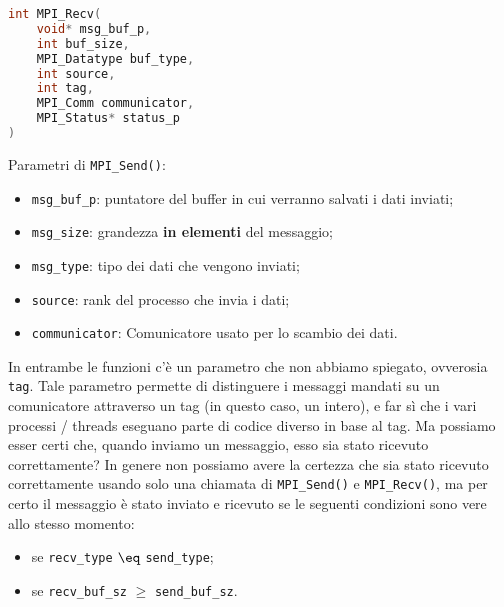 \begin{codedefine}
    \begin{lstlisting}[language = C, numbers = none]
int MPI_Recv(
    void* msg_buf_p,
    int buf_size,
    MPI_Datatype buf_type,
    int source,
    int tag,
    MPI_Comm communicator,
    MPI_Status* status_p
)\end{lstlisting}
    \manlower    
    Parametri di \verb|MPI_Send()|:
    \begin{itemize}
        \item \verb|msg_buf_p|: puntatore del buffer in cui verranno salvati i dati inviati;
        \item \verb|msg_size|: grandezza \textbf{in elementi} del messaggio;
        \item \verb|msg_type|: tipo dei dati che vengono inviati;
        \item \verb|source|: rank del processo che invia i dati;
        \item \verb|communicator|: Comunicatore usato per lo scambio dei dati.
    \end{itemize}
\end{codedefine}

In entrambe le funzioni c'è un parametro che non abbiamo spiegato, ovverosia \verb|tag|. Tale parametro permette di distinguere i messaggi mandati su un comunicatore attraverso un tag (in questo caso, un intero), e far sì che i vari processi / threads eseguano parte di codice diverso in base al tag.
\nwl
Ma possiamo esser certi che, quando inviamo un messaggio, esso sia stato ricevuto correttamente? In genere non possiamo avere la certezza che sia stato ricevuto correttamente usando solo una chiamata di \verb|MPI_Send()| e \verb|MPI_Recv()|, ma per certo il messaggio è stato inviato e ricevuto se le seguenti condizioni sono vere allo stesso momento:
\begin{itemize}
    \item se \verb|recv_type| $\eq$ \verb|send_type|;
    \item se \verb|recv_buf_sz| $\geq$ \verb|send_buf_sz|.
\end{itemize}

